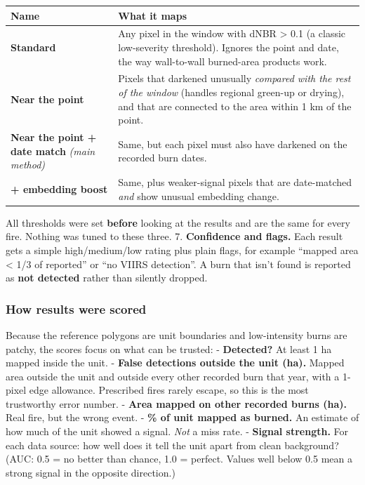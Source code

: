 \documentclass[
]{article}
\begin{document}
\begin{longtable}[]{@{}
  >{\raggedright\arraybackslash}p{}
  >{\raggedright\arraybackslash}p{}@{}}
\toprule\noalign{}
\begin{minipage}[b]{\linewidth}\raggedright
Name
\end{minipage} & \begin{minipage}[b]{\linewidth}\raggedright
What it maps
\end{minipage} \\
\midrule\noalign{}
\endhead
\bottomrule\noalign{}
\endlastfoot
\textbf{Standard} & Any pixel in the window with dNBR \textgreater{} 0.1
(a classic low-severity threshold). Ignores the point and date, the way
wall-to-wall burned-area products work. \\
\textbf{Near the point} & Pixels that darkened unusually \emph{compared
with the rest of the window} (handles regional green-up or drying), and
that are connected to the area within 1 km of the point. \\
\textbf{Near the point + date match} \emph{(main method)} & Same, but
each pixel must also have darkened on the recorded burn dates. \\
\textbf{+ embedding boost} & Same, plus weaker-signal pixels that are
date-matched \emph{and} show unusual embedding change. \\
\end{longtable}

All thresholds were set \textbf{before} looking at the results and are
the same for every fire. Nothing was tuned to these three. 7.
\textbf{Confidence and flags.} Each result gets a simple high/medium/low
rating plus plain flags, for example ``mapped area \textless{} 1/3 of
reported'' or ``no VIIRS detection''. A burn that isn't found is
reported as \textbf{not detected} rather than silently dropped.

\subsubsection{How results were scored}\label{how-results-were-scored}

Because the reference polygons are unit boundaries and low-intensity
burns are patchy, the scores focus on what can be trusted: -
\textbf{Detected?} At least 1 ha mapped inside the unit. - \textbf{False
detections outside the unit (ha).} Mapped area outside the unit and
outside every other recorded burn that year, with a 1-pixel edge
allowance. Prescribed fires rarely escape, so this is the most
trustworthy error number. - \textbf{Area mapped on other recorded burns
(ha).} Real fire, but the wrong event. - \textbf{\% of unit mapped as
burned.} An estimate of how much of the unit showed a signal. \emph{Not}
a miss rate. - \textbf{Signal strength.} For each data source: how well
does it tell the unit apart from clean background? (AUC: 0.5 = no better
than chance, 1.0 = perfect. Values well below 0.5 mean a strong signal
in the opposite direction.)
\end{document}
